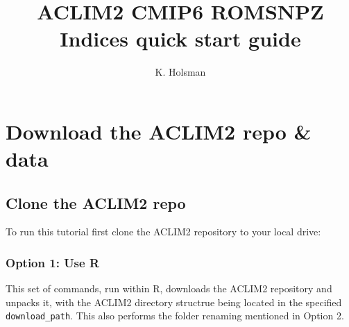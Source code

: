 \documentclass[
]{article}
\title{ACLIM2 CMIP6 ROMSNPZ Indices quick start guide}
\author{K. Holsman}
\date{}
\begin{document}
\maketitle

{
\setcounter{tocdepth}{3}
\tableofcontents
}
\hypertarget{download-the-aclim2-repo-data}{%
\section{Download the ACLIM2 repo \&
data}\label{download-the-aclim2-repo-data}}

\hypertarget{clone-the-aclim2-repo}{%
\subsection{Clone the ACLIM2 repo}\label{clone-the-aclim2-repo}}

To run this tutorial first clone the ACLIM2 repository to your local
drive:

\hypertarget{option-1-use-r}{%
\subsubsection{Option 1: Use R}\label{option-1-use-r}}

This set of commands, run within R, downloads the ACLIM2 repository and
unpacks it, with the ACLIM2 directory structrue being located in the
specified \texttt{download\_path}. This also performs the folder
renaming mentioned in Option 2.
\end{document}
